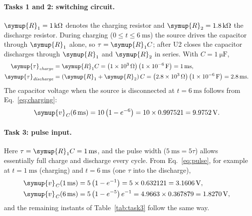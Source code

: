 \documentclass[12pt,a4paper]{article}
\begin{document}
	\paragraph{Tasks 1 and 2: switching circuit.}
	$\symup{R}_{1} = \SI{1}{\kilo\ohm}$ denotes the charging resistor and
	$\symup{R}_{2} = \SI{1.8}{\kilo\ohm}$ the discharge resistor.  During charging
	($0 \le t \le \SI{6}{\milli\second}$) the source drives the capacitor
	through $\symup{R}_{1}$ alone, so $\tau = \symup{R}_{1}C$; after U2 closes the
	capacitor discharges through $\symup{R}_{1}$ and $\symup{R}_{2}$ in series.  With
	$C = \SI{1}{\micro\farad}$,
	\begin{align}
		\symup{\tau}_{\mathit{charge}} &= \symup{R}_{1} C
		= \left(1\times10^{3}\,\si{\ohm}\right)
		\left(1\times10^{-6}\,\si{\farad}\right)
		= \SI{1}{\milli\second}, \\
		\symup{\tau}_{\mathit{discharge}} &= (\symup{R}_{1} + \symup{R}_{2})\,C
		= \left(2.8\times10^{3}\,\si{\ohm}\right)
		\left(1\times10^{-6}\,\si{\farad}\right)
		= \SI{2.8}{\milli\second}.
	\end{align}
	The capacitor voltage when the source is disconnected at
	$t = \SI{6}{\milli\second}$ follows from Eq.~\eqref{eq:charging}:
	\begin{equation}
		\symup{v}_{\mathit{C}}(\SI{6}{\milli\second}) = 10\left(1 - e^{-6}\right)
		= 10 \times 0.997521 = \SI{9.9752}{\volt}.
	\end{equation}
	
	\paragraph{Task 3: pulse input.}
	Here $\tau = \symup{R}_{1} C = \SI{1}{\milli\second}$, and the pulse width
	($\SI{5}{\milli\second} = 5\tau$) allows essentially full charge and
	discharge every cycle.  From Eq.~\eqref{eq:pulse}, for example at
	$t = \SI{1}{\milli\second}$ (charging) and $t = \SI{6}{\milli\second}$
	(one $\tau$ into the discharge),
	\begin{align}
		\symup{v}_{\mathit{C}}(\SI{1}{\milli\second}) &= 5\left(1 - e^{-1}\right)
		= 5 \times 0.632121 = \SI{3.1606}{\volt}, \\
		\symup{v}_{\mathit{C}}(\SI{6}{\milli\second}) &= 5\left(1 - e^{-5}\right)e^{-1}
		= 4.9663 \times 0.367879 = \SI{1.8270}{\volt},
	\end{align}
	and the remaining instants of Table~\ref{tab:task3} follow the same
	way.
	
\end{document}
